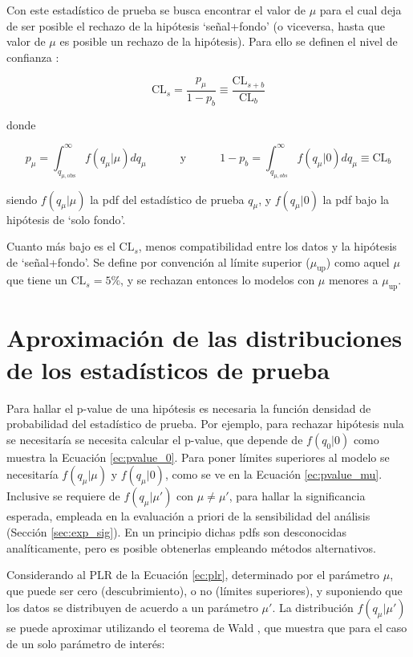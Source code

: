 Con este estadístico de prueba se busca encontrar el valor de $\mu$ para el cual deja de ser posible el rechazo de la hipótesis `señal+fondo' (o viceversa, hasta que valor de $\mu$ es posible un rechazo de la hipótesis). Para ello se definen el nivel de confianza \cite{Read:2002hq}:

\begin{equation}
	\text{CL}_{s} = \frac{p_{\mu}}{1-p_{b}} \equiv \frac{\text{CL}_{s+b}}{\text{CL}_{b}}
\end{equation}


\noindent 
donde

\begin{equation}
	p_{\mu} = \int_{q_{\mu, \text{obs}}}^{\infty} f(q_\mu|\mu)dq_\mu \quad\quad\quad \text{y} \quad\quad\quad 1-p_b = \int_{q_{\mu, obs}}^{\infty} f(q_\mu|0)dq_\mu \equiv \text{CL}_{b}
	\label{ec:pvalue_mu}
\end{equation}

\noindent
siendo $f(q_\mu|\mu)$ la pdf del estadístico de prueba $q_\mu$, y $f(q_\mu|0)$ la pdf bajo la hipótesis de `solo fondo'.

Cuanto más bajo es el $\text{CL}_{s}$, menos compatibilidad entre los datos y la hipótesis de `señal+fondo'. Se define por convención al límite superior ($\mu_{\text{up}}$) como aquel $\mu$ que tiene un $\text{CL}_{s}=5\%$, y se rechazan entonces lo modelos con $\mu$ menores a $\mu_{\text{up}}$.




\section{Aproximación de las distribuciones de los estadísticos de prueba}

Para hallar el p-value de una hipótesis es necesaria la función densidad de probabilidad del estadístico de prueba. Por ejemplo, para rechazar hipótesis nula se necesitaría se necesita calcular el p-value, que depende de $f(q_{0}|0)$ como muestra la Ecuación \ref{ec:pvalue_0}. Para poner límites superiores al modelo se necesitaría $f(q_{\mu}|\mu)$ y $f(q_{\mu}|0)$, como se ve en la Ecuación \ref{ec:pvalue_mu}. Inclusive se requiere de $f(q_{\mu}|\mu')$ con $\mu\neq\mu'$, para hallar la significancia esperada, empleada en la evaluación a priori de la sensibilidad del análisis (Sección \ref{sec:exp_sig}). En un principio dichas pdfs son desconocidas analíticamente, pero es posible obtenerlas empleando métodos alternativos.

Considerando al PLR de la Ecuación \ref{ec:plr}, determinado por el parámetro $\mu$, que puede ser cero (descubrimiento), o no (límites superiores), y suponiendo que los datos se distribuyen de acuerdo a un parámetro $\mu'$. La distribución $f(q_{\mu}|\mu')$ se puede aproximar utilizando el teorema de Wald \cite{10.2307/1990256}, que muestra que para el caso de un solo parámetro de interés:

